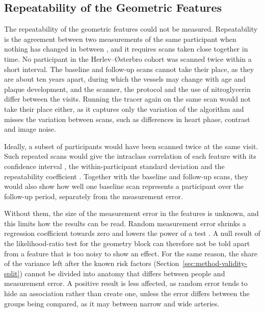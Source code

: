 \subsection{Repeatability of the Geometric Features}
\label{sec:disc-validity-repeatability}

The repeatability of the geometric features could not be measured.
Repeatability is the agreement between two measurements of the same participant when nothing has changed in between \cite{mokkink2010cosmin}, and it requires scans taken close together in time.
No participant in the Herlev--{\O}sterbro cohort was scanned twice within a short interval.
The baseline and follow-up scans cannot take their place, as they are about ten years apart, during which the vessels may change with age and plaque development, and the scanner, the protocol and the use of nitroglycerin differ between the visits.
Running the tracer again on the same scan would not take their place either, as it captures only the variation of the algorithm and misses the variation between scans, such as differences in heart phase, contrast and image noise.

Ideally, a subset of participants would have been scanned twice at the same visit.
Such repeated scans would give the intraclass correlation of each feature with its confidence interval \cite{mcgraw1996icc, koo2016icc}, the within-participant standard deviation and the repeatability coefficient \cite{raunig2015qib}.
Together with the baseline and follow-up scans, they would also show how well one baseline scan represents a participant over the follow-up period, separately from the measurement error.

Without them, the size of the measurement error in the features is unknown, and this limits how the results can be read.
Random measurement error shrinks a regression coefficient towards zero and lowers the power of a test \cite{frost2000dilution, hutcheon2010dilution}.
A null result of the likelihood-ratio test for the geometry block can therefore not be told apart from a feature that is too noisy to show an effect.
For the same reason, the share of the variance left after the known risk factors (Section~\ref{sec:method-validity-split}) cannot be divided into anatomy that differs between people and measurement error.
A positive result is less affected, as random error tends to hide an association rather than create one, unless the error differs between the groups being compared, as it may between narrow and wide arteries.
